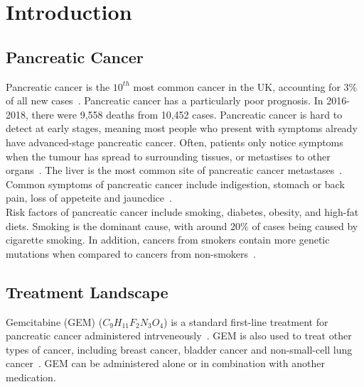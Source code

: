\chapter{Introduction}

\section{Pancreatic Cancer}
Pancreatic cancer is the $10^{th}$ most common cancer in the UK, accounting for $3\%$ of all new cases~\cite{pancStat}. Pancreatic cancer has a particularly poor prognosis. In 2016-2018, there were 9,558 deaths from 10,452 cases. Pancreatic cancer is hard to detect at early stages, meaning most people who present with symptoms already have advanced-stage pancreatic cancer. Often, patients only notice symptoms when the tumour has spread to surrounding tissues, or metastises to other organs~\cite{kelsen}. The liver is the most common site of pancreatic cancer metastases~\cite{deeb}. Common symptoms of pancreatic cancer include indigestion, stomach or back pain, loss of appeteite and jauncdice~\cite{pancSymp}. \\

Risk factors of pancreatic cancer include smoking, diabetes, obesity, and high-fat diets. Smoking is the dominant cause, with around $20\%$ of cases being caused by cigarette smoking. In addition, cancers from smokers contain more genetic mutations when compared to cancers from non-smokers~\cite{blackford}. 

\section{Treatment Landscape}
Gemcitabine (GEM) ($C_9H_{11}F_2N_3O_4$) is a standard first-line treatment for pancreatic cancer administered intrveneously~\cite{NG85}. GEM is also used to treat other types of cancer, including breast cancer, bladder cancer and non-small-cell lung cancer~\cite{wong2009}. GEM can be administered alone or in combination with another medication.